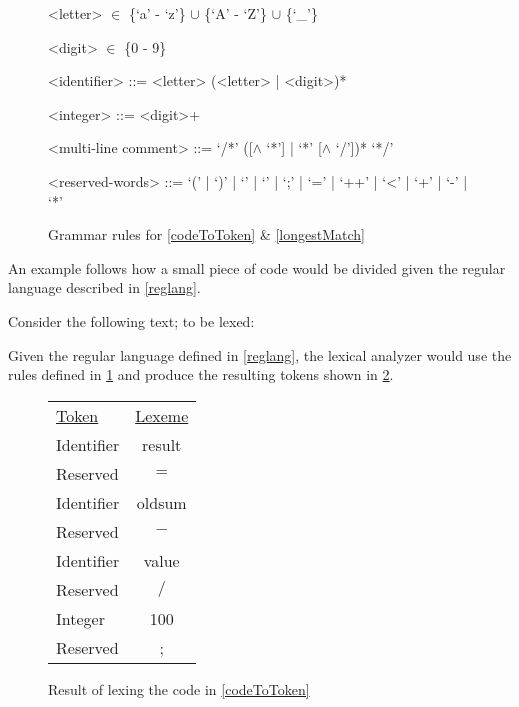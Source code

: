 \begin{figure}[h!]
\begin{center}
\begin{grammar}

<letter>  $\in$ \{`a' - `z'\} $\cup$ \{`A' - `Z'\} $\cup$ \{`_'\}

<digit>  $\in$ \{0 - 9\}

<identifier> ::= <letter> (<letter> | <digit>)* 

<integer> ::= <digit>+

<multi-line comment> ::= `/*' ([$\wedge$ `*'] | `*' [$\wedge$ `/'])* `*/'

<reserved-words> ::= `(' | `)' | `{' | `}' | `;' | `=' | `++' | `<' | `+' | `-' | `*'

\end{grammar}
\caption{Grammar rules for \cref{codeToToken} \& \cref{longestMatch}\label{fig:grammar}}
\end{center}
\end{figure}

An example follows how a small piece of code would be divided given the regular
language described in \cref{reglang}.

\begin{example} \label{codeToToken}$ $\\
Consider the following text; to be lexed:

Given the regular language defined in \cref{reglang}, the lexical analyzer would
use the rules defined in \cref{fig:grammar} and produce the resulting
tokens shown in \cref{fig:codeToToken}.

\begin{figure}[h!]
\begin{center}
\begin{tabular}{l c}
\underline{Token} & \underline{Lexeme}\\
Identifier & result\\
Reserved & $=$\\
Identifier & oldsum\\
Reserved & $-$\\
Identifier & value\\
Reserved & $/$\\
Integer & 100\\
Reserved & ;
\end{tabular}
\end{center}
\caption{Result of lexing the code in \cref{codeToToken} \label{fig:codeToToken}}
\end{figure}
\end{example}

